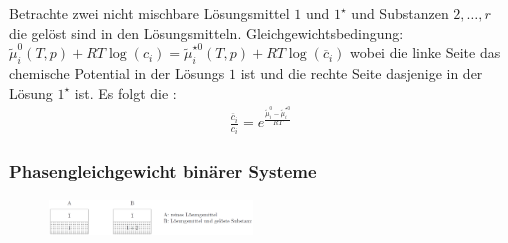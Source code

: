 Betrachte zwei nicht mischbare Lösungsmittel $1$ und $1^\star$ und Substanzen
$2,\dots,r$ die gelöst sind in den Lösungsmitteln. Gleichgewichtsbedingung:
$\tilde{\mu}_i^0 (T,p) + R T \log(c_i) = \tilde{\mu}_i^{\star 0} (T,p) + R T \log(\overline{c}_i)$
wobei die linke Seite das chemische Potential in der Lösungs $1$ ist und die rechte
Seite dasjenige in der Lösung $1^\star$ ist. Es folgt die :
\begin{align*}
    \frac{\overline{c}_i}{c_i} = e^{\frac{\tilde{\mu}_i^0 - \tilde{\mu}_i^{\star 0}}{R T}}
\end{align*}

\subsubsection{Phasengleichgewicht binärer Systeme}

\begin{figure}[h]
    \centering
    \includegraphics[width=0.48\textwidth]{Bilder/Phasengleichgewicht_binaere_Systeme.png}
\end{figure}

